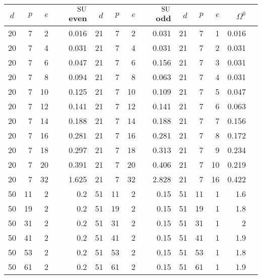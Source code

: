 \documentclass[12pt]{report}
\def\SU{{\rm SU}}
\begin{document}
\begin{table}[htp]																							
\label{timings}																							
\begin{center}																							
\begin{tabular}																							
{|c|r|r|r||r|r|r|r||r|r|r|r|r|} \hline																							
$d$	&	$p$ 	&	$e$ 	&	$\SU$ even 	&	$d$	&	$p$ 	&	$e$ 	&	$\SU$ odd	&	$d$	&	$p$ 	&	$e$ 	&	$\Omega^0$ 	
\rule{0cm}{2.5ex}\\ \hline																							
20	&	7	&	2	&	0.016	&	21	&	7	&	2	&	0.031	&	21	&	7	&	1	&	0.016	\rule{0cm}{2.5ex}\\ \hline
20	&	7	&	4	&	0.031	&	21	&	7	&	4	&	0.031	&	21	&	7	&	2	&	0.031	\rule{0cm}{2.5ex}\\ \hline
20	&	7	&	6	&	0.047	&	21	&	7	&	6	&	0.156	&	21	&	7	&	3	&	0.031	\rule{0cm}{2.5ex}\\ \hline
20	&	7	&	8	&	0.094	&	21	&	7	&	8	&	0.063	&	21	&	7	&	4	&	0.031	\rule{0cm}{2.5ex}\\ \hline
20	&	7	&	10	&	0.125	&	21	&	7	&	10	&	0.109	&	21	&	7	&	5	&	0.047	\rule{0cm}{2.5ex}\\ \hline
20	&	7	&	12	&	0.141	&	21	&	7	&	12	&	0.141	&	21	&	7	&	6	&	0.063	\rule{0cm}{2.5ex}\\ \hline
20	&	7	&	14	&	0.188	&	21	&	7	&	14	&	0.188	&	21	&	7	&	7	&	0.156	\rule{0cm}{2.5ex}\\ \hline
20	&	7	&	16	&	0.281	&	21	&	7	&	16	&	0.281	&	21	&	7	&	8	&	0.172	\rule{0cm}{2.5ex}\\ \hline
20	&	7	&	18	&	0.297	&	21	&	7	&	18	&	0.313	&	21	&	7	&	9	&	0.234	\rule{0cm}{2.5ex}\\ \hline
20	&	7	&	20	&	0.391	&	21	&	7	&	20	&	0.406	&	21	&	7	&	10	&	0.219	\rule{0cm}{2.5ex}\\ \hline
20	&	7	&	32	&	1.625	&	21	&	7	&	32	&	2.828	&	21	&	7	&	16	&	0.422	\rule{0cm}{2.5ex}\\ \hline
50	&	11	&	2	&	0.2	&	51	&	11	&	2	&	0.15	&	51	&	11	&	1	&	1.6	\rule{0cm}{2.5ex}\\ \hline
50	&	19	&	2	&	0.2	&	51	&	19	&	2	&	0.15	&	51	&	19	&	1	&	1.8	\rule{0cm}{2.5ex}\\ \hline
50	&	31	&	2	&	0.2	&	51	&	31	&	2	&	0.15	&	51	&	31	&	1	&	2	\rule{0cm}{2.5ex}\\ \hline
50	&	41	&	2	&	0.2	&	51	&	41	&	2	&	0.15	&	51	&	41	&	1	&	1.9	\rule{0cm}{2.5ex}\\ \hline
50	&	53	&	2	&	0.2	&	51	&	53	&	2	&	0.15	&	51	&	53	&	1	&	1.8	\rule{0cm}{2.5ex}\\ \hline
50	&	61	&	2	&	0.2	&	51	&	61	&	2	&	0.15	&	51	&	61	&	1	&	1.9	\rule{0cm}{2.5ex}\\ \hline

\end{tabular}
\end{center}
\end{table}
\end{document}
